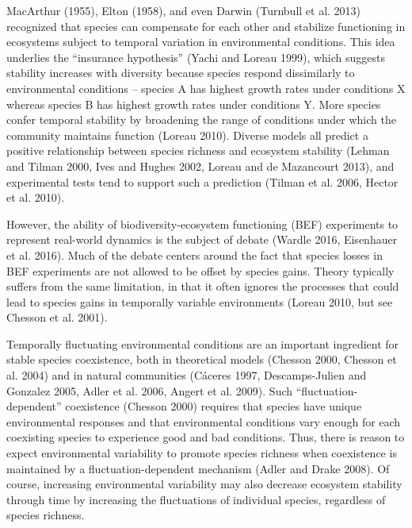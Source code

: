 \documentclass[12pt,]{article}
\begin{document}
MacArthur (1955), Elton (1958), and even Darwin (Turnbull et al. 2013)
recognized that species can compensate for each other and stabilize
functioning in ecosystems subject to temporal variation in environmental
conditions. This idea underlies the ``insurance hypothesis'' (Yachi and
Loreau 1999), which suggests stability increases with diversity because
species respond dissimilarly to environmental conditions -- species A
has highest growth rates under conditions X whereas species B has
highest growth rates under conditions Y. More species confer temporal
stability by broadening the range of conditions under which the
community maintains function (Loreau 2010). Diverse models all predict a
positive relationship between species richness and ecosystem stability
(Lehman and Tilman 2000, Ives and Hughes 2002, Loreau and {{de
Mazancourt}} 2013), and experimental tests tend to support such a
prediction (Tilman et al. 2006, Hector et al. 2010).

However, the ability of biodiversity-ecosystem functioning (BEF)
experiments to represent real-world dynamics is the subject of debate
(Wardle 2016, Eisenhauer et al. 2016). Much of the debate centers around
the fact that species losses in BEF experiments are not allowed to be
offset by species gains. Theory typically suffers from the same
limitation, in that it often ignores the processes that could lead to
species gains in temporally variable environments (Loreau 2010, but see
Chesson et al. 2001).

Temporally fluctuating environmental conditions are an important
ingredient for stable species coexistence, both in theoretical models
(Chesson 2000, Chesson et al. 2004) and in natural communities
(C{á}ceres 1997, Descamps-Julien and Gonzalez 2005, Adler et al. 2006,
Angert et al. 2009). Such ``fluctuation-dependent'' coexistence (Chesson
2000) requires that species have unique environmental responses and that
environmental conditions vary enough for each coexisting species to
experience good and bad conditions. Thus, there is reason to expect
environmental variability to promote species richness when coexistence
is maintained by a fluctuation-dependent mechanism (Adler and Drake
2008). Of course, increasing environmental variability may also decrease
ecosystem stability through time by increasing the fluctuations of
individual species, regardless of species richness.
\end{document}

